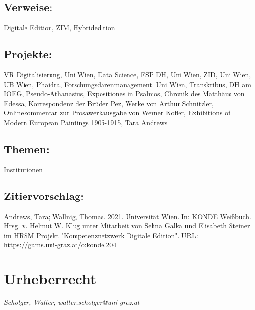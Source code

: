 \documentclass{article}
\begin{document}
        \subsection*{Verweise:}\href{https://gams.uni-graz.at/o:konde.59}{Digitale Edition}, \href{https://gams.uni-graz.at/o:konde.217}{ZIM}, \href{https://gams.uni-graz.at/o:konde.96}{Hybridedition}\subsection*{Projekte:}\href{https://rektorat.univie.ac.at/rektorat/vizerektorinnen/vizerektor-maier/geschaeftsbereich/}{VR Digitalisierung, Uni Wien}, \href{https://datascience.univie.ac.at/}{Data Science}, \href{https://fsp-digital-humanities.univie.ac.at/}{FSP DH, Uni Wien}, \href{https://zid.univie.ac.at/}{ZID, Uni Wien}, \href{https://bibliothek.univie.ac.at/}{UB Wien}, \href{https://phaidra.univie.ac.at/}{Phaidra}, \href{https://datamanagement.univie.ac.at/en/rdm/network-software-development/}{Forschungsdarenmanagement, Uni Wien}, \href{https://readcoop.eu/}{Transkribus}, \href{https://geschichtsforschung.univie.ac.at/ueber-uns/digitale-themen-am-ioeg/}{DH am IOEG}, \href{https://etfkg.univie.ac.at/en/about-us/team/uta-heil/}{Pseudo-Athanasius, Expositiones in Psalmos}, \href{https://editions.byzantini.st/ChronicleME/}{Chronik des Matthäus von Edessa}, \href{http://vemg.at/pez-edition-und-nachlass/}{Korrespondenz der Brüder Pez}, \href{https://www.univie.ac.at/germanistik/projekt/arthur-schnitzler-fruehwerk-3/}{Werke von Arthur Schnitzler}, \href{https://gams.uni-graz.at/archive/objects/context:kofler/methods/sdef:Context/get?mode=print}{Onlinekommentar zur Prosawerkausgabe von Werner Kofler}, \href{https://exhibitions.univie.ac.at/}{Exhibitions of Modern European Paintings 1905-1915}, \href{https://ufind.univie.ac.at/de/person.html?id=62558}{Tara Andrews}\subsection*{Themen:}Institutionen\subsection*{Zitiervorschlag:}Andrews, Tara; Wallnig, Thomas. 2021. Universität Wien. In: KONDE Weißbuch. Hrsg. v. Helmut W. Klug unter Mitarbeit von Selina Galka und Elisabeth Steiner im HRSM Projekt "Kompetenznetzwerk Digitale Edition". URL: https://gams.uni-graz.at/o:konde.204\newpage\section*{Urheberrecht} \emph{Scholger, Walter; walter.scholger@uni-graz.at }\\
        
\end{document}
